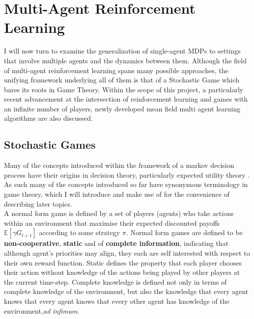 \section{Multi-Agent Reinforcement Learning}
I will now turn to examine the generalization of single-agent MDPs to settings that involve multiple agents
and the dynamics between them. Although the field of multi-agent reinforcement learning spans many possible
approaches, the unifying framework underlying all of them is that of a Stochastic Game which bares its roots in 
Game Theory. Within the scope of this project, a particularly recent advancement at the intersection of
reinforcement learning and games with an infinite number of players, newly developed mean field multi agent
learning algorithms are also discussed.
\subsection{Stochastic Games}
Many of the concepts introduced within the framework of a markov decision process have their
origins in decision theory, particularly expected utility theory \cite{sutton2018reinforcement}.
As such many of the concepts introduced so far have synonymous terminology in game theory, which
I will introduce and make use of for the convenience of describing later topics. \\

A normal form game is defined by a set of players (agents) who take actions within an environment
that maximise their expected discounted payoffs $\mathbb{E}[\gamma G_{t+1}]$ according to some strategy
$\pi$. Normal form games are defined to be \textbf{non-cooperative}, \textbf{static} and of \textbf{complete information},
indicating that although agent's priorities may align, they each are self interested with respect
to their own reward function. Static defines the property that each player chooses their action 
without knowledge of the actions being played by other players at the current time-step. Complete knowledge
is defined not only in terms of complete knowledge of the environment, but also the knowledge that
every agent knows that every agent knows that every other agent has knowledge of the environment,\emph{ad infimum}. \\

